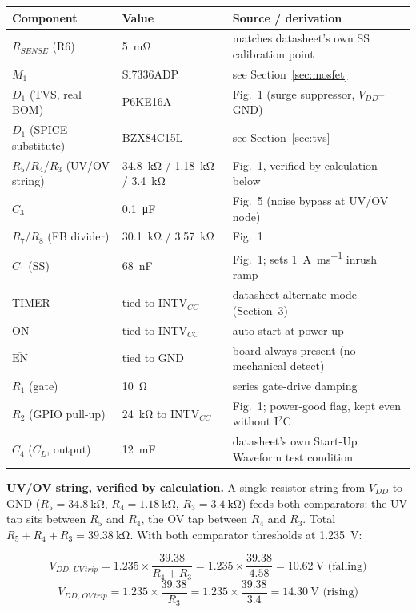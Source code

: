 \documentclass[11pt,letterpaper]{article}
\begin{document}
\begin{center}
\begin{tabular}{@{}lll@{}}
\toprule
\textbf{Component} & \textbf{Value} & \textbf{Source / derivation} \\
\midrule
$R_{SENSE}$ (R6) & \SI{5}{\milli\ohm} & matches datasheet's own SS calibration point \\
$M_1$ & Si7336ADP & see Section~\ref{sec:mosfet} \\
$D_1$ (TVS, real BOM) & P6KE16A & Fig.~1 (surge suppressor, $V_{DD}$--GND) \\
$D_1$ (SPICE substitute) & BZX84C15L & see Section~\ref{sec:tvs} \\
$R_5$/$R_4$/$R_3$ (UV/OV string) & \SI{34.8}{\kilo\ohm} / \SI{1.18}{\kilo\ohm} / \SI{3.4}{\kilo\ohm} & Fig.~1, verified by calculation below \\
$C_3$ & \SI{0.1}{\micro\farad} & Fig.~5 (noise bypass at UV/OV node) \\
$R_7$/$R_8$ (FB divider) & \SI{30.1}{\kilo\ohm} / \SI{3.57}{\kilo\ohm} & Fig.~1 \\
$C_1$ (SS) & \SI{68}{\nano\farad} & Fig.~1; sets \SI{1}{\ampere\per\milli\second} inrush ramp \\
TIMER & tied to INTV$_{CC}$ & datasheet alternate mode (Section~3) \\
ON & tied to INTV$_{CC}$ & auto-start at power-up \\
$\overline{\text{EN}}$ & tied to GND & board always present (no mechanical detect) \\
$R_1$ (gate) & \SI{10}{\ohm} & series gate-drive damping \\
$R_2$ (GPIO pull-up) & \SI{24}{\kilo\ohm} to INTV$_{CC}$ & Fig.~1; power-good flag, kept even without I$^2$C \\
$C_4$ ($C_L$, output) & \SI{12}{\milli\farad} & datasheet's own Start-Up Waveform test condition \\
\bottomrule
\end{tabular}
\end{center}

\textbf{UV/OV string, verified by calculation.} A single resistor string from $V_{DD}$ to GND
($R_5=\SI{34.8}{\kilo\ohm}$, $R_4=\SI{1.18}{\kilo\ohm}$, $R_3=\SI{3.4}{\kilo\ohm}$) feeds both comparators:
the UV tap sits between $R_5$ and $R_4$, the OV tap between $R_4$ and $R_3$. Total
$R_5+R_4+R_3=\SI{39.38}{\kilo\ohm}$. With both comparator thresholds at \SI{1.235}{\volt}:

\begin{equation}
V_{DD,\,UV\,trip} = 1.235 \times \frac{39.38}{R_4+R_3} = 1.235\times\frac{39.38}{4.58} = \boxed{\SI{10.62}{\volt}} \text{ (falling)}
\end{equation}
\begin{equation}
V_{DD,\,OV\,trip} = 1.235 \times \frac{39.38}{R_3} = 1.235\times\frac{39.38}{3.4} = \boxed{\SI{14.30}{\volt}} \text{ (rising)}
\end{equation}
\end{document}
